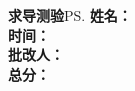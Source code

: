 \linespread{1.2}

\begin{center}
	{\huge\bf 求\;导\;测\;验}\ps{\bf\large \hspace{-2cm}姓名：\\[2em]
	
	\hspace{-2cm}时间：\\[2em]
	
	\hspace{-2cm}批改人：\\[2em]
	
	\hspace{-2cm}总分：}
\end{center}

\vspace{-1em}

